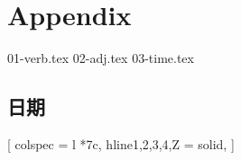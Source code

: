 \chapter{Appendix}

{01-verb.tex}
{02-adj.tex}
{03-time.tex}

\section{日期}

[
  colspec = {l *{7}{c}},
  hline{1,2,3,4,Z} = {solid},
]
